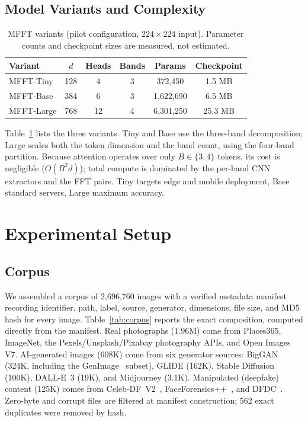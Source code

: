 \documentclass[journal]{IEEEtran}
\begin{document}
\subsection{Model Variants and Complexity}
\begin{table}[!t]
\renewcommand{\arraystretch}{1.2}
\caption{MFFT variants (pilot configuration, $224\times224$ input). Parameter counts and checkpoint sizes are measured, not estimated.}
\label{tab:variants}
\centering
\begin{tabular}{lccccc}
\toprule
Variant & $d$ & Heads & Bands & Params & Checkpoint \\
\midrule
MFFT-Tiny  & 128 & 4  & 3 & 372{,}450   & 1.5 MB \\
MFFT-Base  & 384 & 6  & 3 & 1{,}622{,}690 & 6.5 MB \\
MFFT-Large & 768 & 12 & 4 & 6{,}301{,}250 & 25.3 MB \\
\bottomrule
\end{tabular}
\end{table}
Table~\ref{tab:variants} lists the three variants. Tiny and Base use the three-band decomposition; Large scales both the token dimension and the band count, using the four-band partition. Because attention operates over only $B \in \{3,4\}$ tokens, its cost is negligible ($O(B^2 d)$); total compute is dominated by the per-band CNN extractors and the FFT pairs. Tiny targets edge and mobile deployment, Base standard servers, Large maximum accuracy.

\section{Experimental Setup}

\subsection{Corpus}
\label{sec:dataset}
We assembled a corpus of 2{,}696{,}760 images with a verified metadata manifest recording identifier, path, label, source, generator, dimensions, file size, and MD5 hash for every image. Table~\ref{tab:corpus} reports the exact composition, computed directly from the manifest. Real photographs (1.96M) come from Places365, ImageNet, the Pexels/Unsplash/Pixabay photography APIs, and Open Images V7. AI-generated images (608K) come from six generator sources: BigGAN (324K, including the GenImage~\cite{zhu2023genimage} subset), GLIDE (162K), Stable Diffusion (100K), DALL-E~3 (19K), and Midjourney (3.1K). Manipulated (deepfake) content (125K) comes from Celeb-DF~V2~\cite{li2020celebdf}, FaceForensics++~\cite{rossler2019}, and DFDC~\cite{dolhansky2020}. Zero-byte and corrupt files are filtered at manifest construction; 562 exact duplicates were removed by hash.
\end{document}

